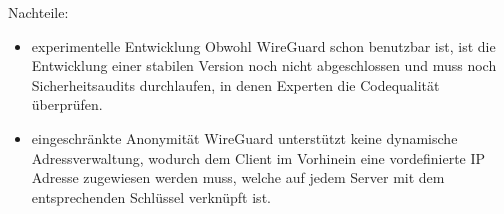 Nachteile:
\begin{itemize}
    \item experimentelle Entwicklung \newline
    Obwohl WireGuard schon benutzbar ist, ist die Entwicklung einer stabilen Version noch nicht abgeschlossen und muss noch Sicherheitsaudits durchlaufen, in denen Experten die Codequalität überprüfen.
    \item eingeschränkte Anonymität \newline
    WireGuard unterstützt keine dynamische Adressverwaltung, wodurch dem Client im Vorhinein eine vordefinierte IP Adresse zugewiesen werden muss, welche auf jedem Server mit dem entsprechenden Schlüssel verknüpft ist.
\end{itemize}
